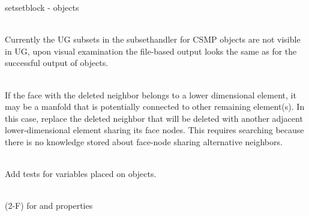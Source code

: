 \begin{DoxyRefList}
setsetblock -\/  objects 
\item[Member \doxylink{classcsmp_1_1_u_g4___u_g_x___file_export___test_a4c92d1cb10fe062bc2354bbac8cf32a0}{csmp\+::UG4\+\_\+\+UGX\+\_\+\+File\+Export\+\_\+\+Test\+::Run} ()]\hfill \\
\label{todo__todo000269}%
%
Currently the UG subsets in the subsethandler for CSMP  objects are not visible in UG, upon visual examination the file-\/based output looks the same as for the successful output of  objects.  
\item[Member \doxylink{namespacecsmp_aac8a8a387e00202cd2388fb507d2ab28}{csmp\+::update\+Halo\+Element\+Connectivity} (typename vector\texorpdfstring{$<$}{<} \doxylink{classcsmp_1_1_element}{Element$<$ dim $>$} \texorpdfstring{$\ast$}{*} \texorpdfstring{$>$}{>}\+::iterator first, typename vector\texorpdfstring{$<$}{<} \doxylink{classcsmp_1_1_element}{Element$<$ dim $>$} \texorpdfstring{$\ast$}{*} \texorpdfstring{$>$}{>}\+::iterator last)]\hfill \\
\label{todo__todo000163}%
%
If the face with the deleted neighbor belongs to a lower dimensional element, it may be a manfold that is potentially connected to other remaining element(s). In this case, replace the deleted neighbor that will be deleted with another adjacent lower-\/dimensional element sharing its face nodes. This requires searching because there is no knowledge stored about face-\/node sharing alternative neighbors. 
\item[Class \doxylink{classcsmp_1_1_variables___test}{csmp\+::Variables\+\_\+\+Test} ]\hfill \\
\label{todo__todo000245}%
%
Add tests for variables placed on  objects. 
\item[Member \doxylink{classcsmp_1_1_variables___test_ada27fe193d2c5a358c6c3723961e5883}{csmp\+::Variables\+\_\+\+Test\+::run} ()]\hfill \\
\label{todo__todo000270}%
%
(2-\/F)  for  and  properties 
\item[Member \doxylink{group___c_s_m_pglobal_functions_ga2457f4f4d5d52678cb7e215a0f453685}{csmp\+::variable\+Type} (const Var \&)]\hfill \\

\end{DoxyRefList}
